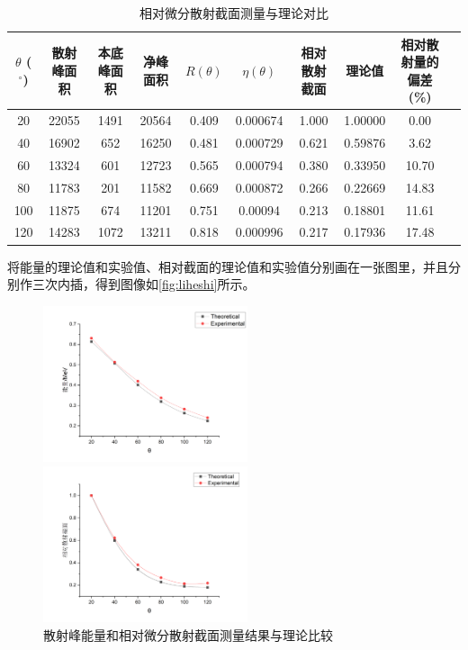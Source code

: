 \documentclass[font=default]{mpltx}
\begin{document}
      \begin{table}[htbp]
        \centering
        \caption{相对微分散射截面测量与理论对比}
        \begin{tabular}{cccccccccc}
          \toprule
          $\theta$ ($^\circ$) & 散射峰面积 & 本底峰面积 & 净峰面积 & $R(\theta)$ & $\eta(\theta)$ & 相对散射截面 & 理论值 & 相对散射量的偏差 (\%) \\
          \midrule
          20 & 22055 & 1491 & 20564 & 0.409 & 0.000674 & 1.000 & 1.00000 & 0.00 \\
          40 & 16902 & 652 & 16250 & 0.481 & 0.000729 & 0.621 & 0.59876 & 3.62 \\
          60 & 13324 & 601 & 12723 & 0.565 & 0.000794 & 0.380 & 0.33950 & 10.70 \\
          80 & 11783 & 201 & 11582 & 0.669 & 0.000872 & 0.266 & 0.22669 & 14.83 \\
          100 & 11875 & 674 & 11201 & 0.751 & 0.00094 & 0.213 & 0.18801 & 11.61 \\
          120 & 14283 & 1072 & 13211 & 0.818 & 0.000996 & 0.217 & 0.17936 & 17.48 \\
          \bottomrule
        \end{tabular}
        \label{tab:scattering_cross_section}
      \end{table}

      将能量的理论值和实验值、相对截面的理论值和实验值分别画在一张图里，并且分别作三次内插，得到图像如\autoref{fig:liheshi}所示。
      \begin{figure}[htbp]
        \centering
        \begin{minipage}[t]{0.48\textwidth}
        \centering
        \includegraphics[width=6cm]{fig/nengliang.png}
        \end{minipage}
        \begin{minipage}[t]{0.48\textwidth}
        \centering
        \includegraphics[width=6cm]{fig/jiemian.png}
        \end{minipage}
        \caption{散射峰能量和相对微分散射截面测量结果与理论比较}
        \label{fig:liheshi}
      \end{figure}
\end{document}
